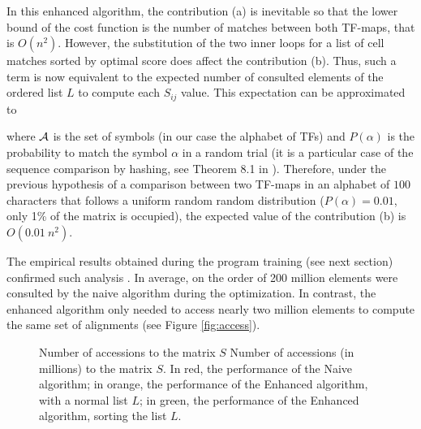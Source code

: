 In this enhanced algorithm, the contribution (a) is inevitable so that
the lower bound of the cost function is the number of matches between
both TF-maps, that is $O(n^2)$. However, the substitution of the two
inner loops for a list of cell matches sorted by optimal score does
affect the contribution (b). Thus, such a term is now equivalent to the expected
number of consulted elements of the ordered list $L$ to compute each $S_{ij}$ value.
This expectation can be approximated to

\begin{center}
\end{center}

where ${\cal A}$ is the set of symbols (in our case the alphabet of TFs) and
$P(\alpha)$ is the probability to match the symbol $\alpha$ in a random trial
(it is a particular case of the sequence comparison by hashing,
see Theorem 8.1 in \cite{waterman:1995a}). Therefore, under the previous 
hypothesis of a comparison between two TF-maps in an alphabet of $100$ characters 
that follows a uniform random random distribution ($P(\alpha) = 0.01$, 
only 1\% of the matrix is occupied), the expected value of the contribution (b) 
is $O(0.01~n^2)$. 

The empirical results obtained during the program training (see next section)
confirmed such analysis \citep{blanco:2006b}. In average, on the order of 200 
million elements were consulted by the naive algorithm during the optimization. 
In contrast, the enhanced algorithm only needed to access nearly two million elements 
to compute the same set of alignments (see Figure \ref{fig:access}).

\clearpage
\begin{figure}[t!]
\begin{center}
\setlength{\fboxsep}{0pt}
          {Number of accessions to the matrix $S$}%
          {Number of accessions (in millions) to the matrix $S$.}%
          {In red, the performance of the Naive algorithm; in orange, the performance
           of the Enhanced algorithm, with a normal list $L$; in green, the performance
           of the Enhanced algorithm, sorting the list $L$.}
\end{center}
\end{figure}

